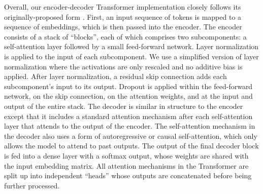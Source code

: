 Overall, our encoder-decoder Transformer implementation closely follows its originally-proposed form \citep{vaswani2017attention}. First, an input sequence of tokens is mapped to a sequence of embeddings, which is then passed into the encoder. The encoder consists of a stack of ``blocks'', each of which comprises two subcomponents: a self-attention layer followed by a small feed-forward network. Layer normalization \citep{ba2016layer} is applied to the input of each subcomponent. We use a simplified version of layer normalization where the activations are only rescaled and no additive bias is applied. After layer normalization, a residual skip connection \citep{he2016deep} adds each subcomponent's input to its output. Dropout \citep{srivastava2014dropout} is applied within the feed-forward network, on the skip connection, on the attention weights, and at the input and output of the entire stack. The decoder is similar in structure to the encoder except that it includes a standard attention mechanism after each self-attention layer that attends to the output of the encoder. The self-attention mechanism in the decoder also uses a form of autoregressive or causal self-attention, which only allows the model to attend to past outputs. The output of the final decoder block is fed into a dense layer with a softmax output, whose weights are shared with the input embedding matrix. All attention mechanisms in the Transformer are split up into independent ``heads'' whose outputs are concatenated before being further processed.

